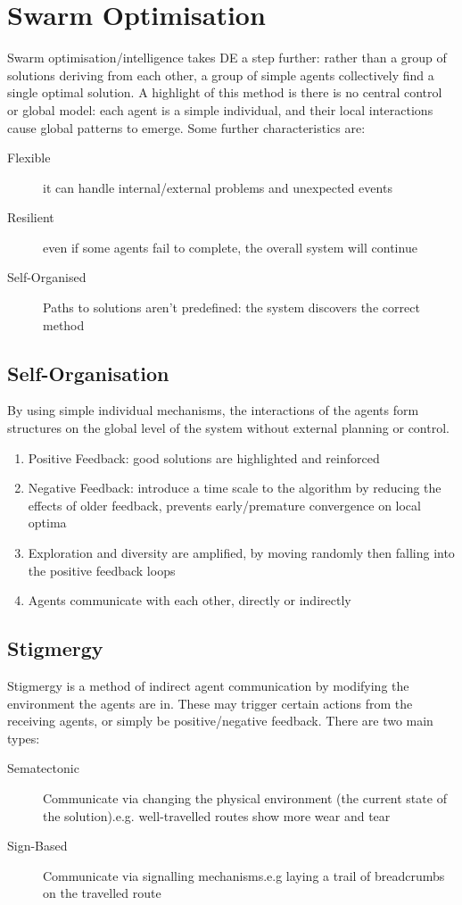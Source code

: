 \section{Swarm Optimisation}
Swarm optimisation/intelligence takes DE a step further: rather than a group of solutions deriving from each other, a group of simple agents collectively find a single optimal solution. A highlight of this method is there is no central control or global model: each agent is a simple individual, and their local interactions cause global patterns to emerge. Some further characteristics are:
\begin{description}
\item [Flexible] it can handle internal/external problems and unexpected events
\item [Resilient] even if some agents fail to complete, the overall system will continue
\item [Self-Organised] Paths to solutions aren't predefined: the system discovers the correct method 
\end{description}

\subsection{Self-Organisation}
By using simple individual mechanisms, the interactions of the agents form structures on the global level of the system without external planning or control. 
\begin{enumerate}
    \item Positive Feedback: good solutions are highlighted and reinforced
    \item Negative Feedback: introduce a time scale to the algorithm by reducing the effects of older feedback, prevents early/premature convergence on local optima
    \item Exploration and diversity are amplified, by moving randomly then falling into the positive feedback loops
    \item Agents communicate with each other, directly or indirectly
\end{enumerate}

\subsection{Stigmergy}
Stigmergy is a method of indirect agent communication by modifying the environment the agents are in. These may trigger certain actions from the receiving agents, or simply be positive/negative feedback. There are two main types:
\begin{description}
    \item[Sematectonic] Communicate via changing the physical environment (the current state of the solution).e.g. well-travelled routes show more wear and tear
    \item[Sign-Based] Communicate via signalling mechanisms.e.g laying a trail of breadcrumbs on the travelled route
\end{description}

